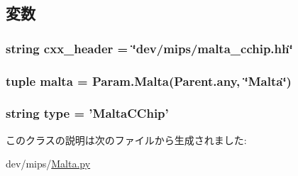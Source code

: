 \subsection{変数}
\hypertarget{classMalta_1_1MaltaCChip_a17da7064bc5c518791f0c891eff05fda}{
\subsubsection[{cxx\_\-header}]{\setlength{\rightskip}{0pt plus 5cm}string {\bf cxx\_\-header} = \char`\"{}dev/mips/malta\_\-cchip.hh\char`\"{}}}
\label{classMalta_1_1MaltaCChip_a17da7064bc5c518791f0c891eff05fda}
\hypertarget{classMalta_1_1MaltaCChip_ae688b1cb082350c971cc4aaf26b66104}{
\subsubsection[{malta}]{\setlength{\rightskip}{0pt plus 5cm}tuple {\bf malta} = Param.Malta(Parent.any, \char`\"{}Malta\char`\"{})}}
\label{classMalta_1_1MaltaCChip_ae688b1cb082350c971cc4aaf26b66104}
\hypertarget{classMalta_1_1MaltaCChip_acce15679d830831b0bbe8ebc2a60b2ca}{
\subsubsection[{type}]{\setlength{\rightskip}{0pt plus 5cm}string {\bf type} = '{\bf MaltaCChip}'}}
\label{classMalta_1_1MaltaCChip_acce15679d830831b0bbe8ebc2a60b2ca}


このクラスの説明は次のファイルから生成されました:\begin{DoxyCompactItemize}
\item 
dev/mips/\hyperlink{Malta_8py}{Malta.py}\end{DoxyCompactItemize}
